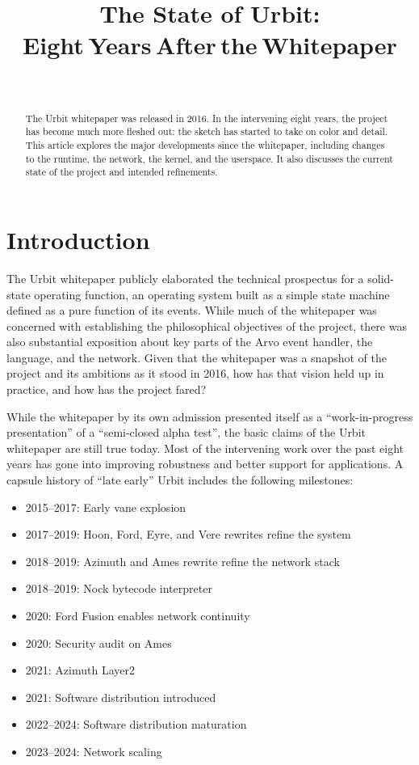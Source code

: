 \documentclass[twoside]{article}
\title{The State of Urbit:\\Eight Years After the Whitepaper}
\author{\authorname~\authorpatp \\ \affiliation}
\date{}
\begin{document}
\maketitle
\thispagestyle{firststyle}

\begin{abstract}
\sloppy
The Urbit whitepaper was released in 2016.  In the intervening eight years, the project has become much more fleshed out:  the sketch has started to take on color and detail.  This article explores the major developments since the whitepaper, including changes to the runtime, the network, the kernel, and the userspace.  It also discusses the current state of the project and intended refinements.
\end{abstract}

\setcounter{page}{1}

\tableofcontents

\section{Introduction}

The Urbit whitepaper \citep{Whitepaper} publicly elaborated the technical prospectus for a solid-state operating function, an operating system built as a simple state machine defined as a pure function of its events.  While much of the whitepaper was concerned with establishing the philosophical objectives of the project, there was also substantial exposition about key parts of the Arvo event handler, the language, and the network.  Given that the whitepaper was a snapshot of the project and its ambitions as it stood in 2016, how has that vision held up in practice, and how has the project fared?

While the whitepaper by its own admission presented itself as a ``work-in-progress presentation'' of a ``semi-closed alpha test'', the basic claims of the Urbit whitepaper are still true today.  Most of the intervening work over the past eight years has gone into improving robustness and better support for applications.  A capsule history of ``late early'' Urbit includes the following milestones:
\begin{itemize}
  \item  2015–2017:  Early vane explosion
  \item  2017–2019:  Hoon, Ford, Eyre, and Vere rewrites refine the system
  \item  2018–2019:  Azimuth and Ames rewrite refine the network stack
  \item  2018–2019:  Nock bytecode interpreter
  \item  2020:  Ford Fusion enables network continuity
  \item  2020:  Security audit on Ames
  \item  2021:  Azimuth Layer2
  \item  2021:  Software distribution introduced
  \item  2022–2024:  Software distribution maturation
  \item  2023–2024:  Network scaling
\end{itemize}
\end{document}
